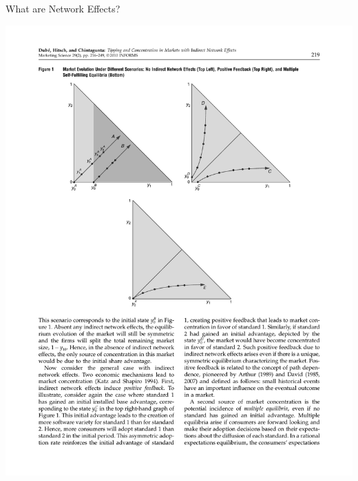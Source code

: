 \documentclass[xcolor=pdftex,dvipsnames,table,mathserif,aspectratio=169]{beamer}
\begin{document}
\begin{frame}{What are Network Effects?}
\begin{center}
\includegraphics[scale=0.5]{resources/triangles.pdf}
\end{center}
\end{frame}
\end{document}
